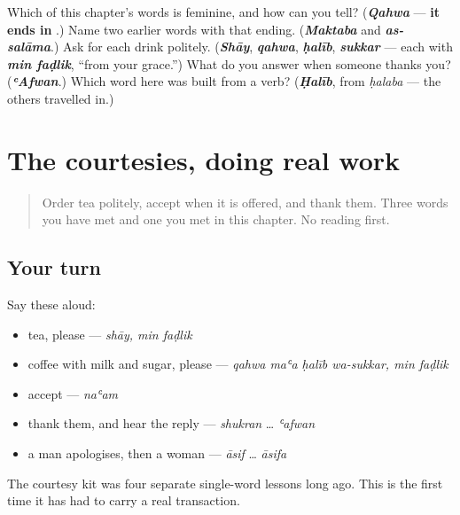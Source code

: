 \begin{tcolorbox}[breakable,colback=teal!4,colframe=teal!35!black,title={Before you move on}]
Which of this chapter's words is feminine, and how can you tell? (\emph{\textbf{Qahwa}} — \textbf{it ends in }.) Name two earlier words with that ending. (\emph{\textbf{Maktaba}} and \emph{\textbf{as-salāma}}.) Ask for each drink politely. (\emph{\textbf{Shāy}}, \emph{\textbf{qahwa}}, \emph{\textbf{ḥalīb}}, \emph{\textbf{sukkar}} — each with \emph{\textbf{min faḍlik}}, \textquotedblleft{}from your grace.\textquotedblright{}) What do you answer when someone thanks you? (\emph{\textbf{ʿAfwan}}.) Which word here was built from a verb? (\emph{\textbf{Ḥalīb}}, from \emph{ḥalaba} — the others travelled in.)
\end{tcolorbox}
\section[\texorpdfstring{\ar{من} \ar{فضلك} · \ar{شكرا} … (min faḍlik …)}{من فضلك · شكرا … (min faḍlik …)}]{The courtesies, doing real work}

\label{lesson:AR-R33-the-courtesies-again}



\begin{quote}
Order tea politely, accept when it is offered, and thank them. Three words you have met and one you met in this chapter. No reading first.
\end{quote}

\subsection*{Your turn}
Say these aloud:

\begin{itemize}
\raggedright
  \item tea, please — \emph{shāy, min faḍlik}
  \item coffee with milk and sugar, please — \emph{qahwa maʿa ḥalīb wa-sukkar, min faḍlik}
  \item accept — \emph{naʿam}
  \item thank them, and hear the reply — \emph{shukran} … \emph{ʿafwan}
  \item a man apologises, then a woman — \emph{āsif} … \emph{āsifa}
\end{itemize}

The courtesy kit was four separate single-word lessons long ago. This is the first time it has had to carry a real transaction.

